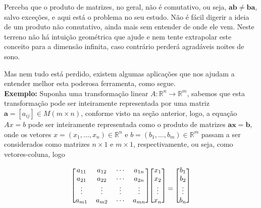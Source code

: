 \documentclass[a4paper,12pt]{article}
\begin{document}
	Perceba que o produto de matrizes, no geral, não é comutativo, ou seja, $\mathbf{ab} \neq \mathbf{ba}$, salvo exceções, e aqui está o problema no seu estudo. Não é fácil digerir a ideia de um produto não comutativo, ainda mais sem entender de onde ele vem. 	Neste terreno não há intuição geométrica que ajude e nem tente extrapolar este conceito para a dimensão infinita, caso contrário perderá agradáveis noites de sono.
	
	Mas nem tudo está perdido, existem algumas aplicações que nos ajudam a entender melhor esta poderosa ferramenta, como segue.
	\\ \newline \textbf{Exemplo: }Suponha uma transformação linear $A: \mathbb{R}^n \longrightarrow \mathbb{R}^m$, sabemos que esta transformação pode ser inteiramente representada por uma matriz $\mathbf{a} = [a_{ij}] \in M(m\times n)$, conforme visto na seção anterior, logo, a equação $Ax = b$ pode ser inteiramente representada como o produto de matrizes $\mathbf{a} \mathbf{x} = \mathbf{b}$, onde os vetores $x = (x_1, \dots, x_n) \in \mathbb{R}^n$ e $b = (b_1, \dots, b_m) \in \mathbb{R}^m$ passam a ser considerados como matrizes $n\times 1$ e $m\times 1$, respectivamente, ou seja, como vetores-coluna, logo
	
	\[ 
	\begin{blockarray}{cccc}
	\begin{block}{[cccc]}
	a_{11} & a_{12} & \cdots & a_{1n} \\
	a_{21} & a_{22} & \cdots & a_{2n} \\
	\vdots & \vdots & \vdots & \vdots \\
	a_{m1} & a_{m2} & \cdots & a_{mn} \\
	\end{block}
	\end{blockarray}
	\begin{blockarray}{c}
	\begin{block}{[c]}
	x_1 \\
	x_2 \\
	\vdots \\
	x_n \\
	\end{block}
	\end{blockarray}=
	\begin{blockarray}{c}
	\begin{block}{[c]}
	b_1 \\
	b_2 \\
	\vdots \\
	b_n \\
	\end{block}
	\end{blockarray}
	\]
	
\end{document}
